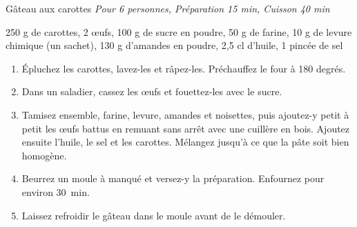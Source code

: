 \begin{recette}{Gâteau aux carottes}
  \emph{Pour 6 personnes,	Préparation 15 min,	Cuisson 40 min}
  \begin{ingredients}
    250 g de carottes\sep
    2 œufs\sep
    100 g de sucre en poudre\sep
    50 g de farine\sep
    10 g de levure chimique (un sachet)\sep
    130 g d'amandes en poudre\sep
    2,5 cl d'huile\sep
    1 pincée de sel
  \end{ingredients}
	\begin{enumerate}
	\item Épluchez les carottes, lavez-les et râpez-les. Préchauffez le four à 180 degrés.
  \item Dans un saladier, cassez les œufs et fouettez-les avec le sucre. \\
  \item Tamisez ensemble, farine, levure, amandes et noisettes, puis ajoutez-y petit à petit les œufs battus en remuant sans arrêt avec une cuillère en bois. Ajoutez ensuite l'huile, le sel et les carottes. Mélangez jusqu'à ce que la pâte soit bien homogène.
  \item Beurrez un moule à manqué et versez-y la préparation. Enfournez pour environ 30~min.
  \item Laissez refroidir le gâteau dans le moule avant de le démouler.
  \end{enumerate}
\end{recette}
